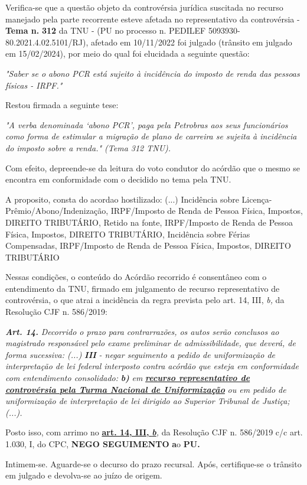 \documentclass[12pt]{article}
\begin{document}
\justifying
\noindent Verifica-se que a questão objeto da controvérsia jurídica suscitada no recurso manejado pela parte recorrente esteve afetada no representativo da controvérsia - \textbf{Tema n. }\textbf{312} da TNU - (PU no processo n. PEDILEF 5093930-80.2021.4.02.5101/RJ),  afetado em 10/11/2022 foi julgado (trânsito em julgado em 15/02/2024), por meio do qual foi elucidada a seguinte questão:

\noindent \textit{"Saber se o abono PCR está sujeito à incidência do imposto de renda das pessoas físicas - IRPF."}

\noindent Restou firmada a seguinte tese:

\noindent \textit{"A verba denominada ‘abono PCR’, paga pela Petrobras aos seus funcionários como forma de estimular a migração de plano de carreira se sujeita à incidência do imposto sobre a renda." (Tema 312 TNU).}

\noindent Com efeito, depreende-se da leitura do voto condutor do acórdão que o mesmo se encontra em conformidade com o decidido no  tema pela TNU.

\noindent A proposito, consta do acordao hostilizado: (...) Incidência sobre Licença-Prêmio/Abono/Indenização, IRPF/Imposto de Renda de Pessoa Física, Impostos, DIREITO TRIBUTÁRIO, Retido na fonte, IRPF/Imposto de Renda de Pessoa Física, Impostos, DIREITO TRIBUTÁRIO, Incidência sobre Férias Compensadas, IRPF/Imposto de Renda de Pessoa Física, Impostos, DIREITO TRIBUTÁRIO

\noindent Nessas condições, o conteúdo do Acórdão recorrido é consentâneo com o entendimento da TNU, firmado em julgamento de recurso representativo de controvérsia, o que atrai a incidência da regra prevista pelo art. 14, III, \textit{b,} da Resolução CJF n. 586/2019:

\noindent \textit{\textbf{Art. 14.}}\textit{ Decorrido o prazo para contrarrazões, os autos serão conclusos ao magistrado responsável pelo exame preliminar de admissibilidade, que deverá, de forma sucessiva: (...) }\textit{\textbf{III }}\textit{- negar seguimento a pedido de uniformização de interpretação de lei federal interposto contra acórdão que esteja em conformidade com entendimento consolidado: }\textit{\textbf{b)}}\textit{ em }\uline{\textit{\textbf{recurso representativo de controvérsia pela Turma Nacional de Uniformização}}}\textit{ ou em pedido de uniformização de interpretação de lei dirigido ao Superior Tribunal de Justiça;(...).}

\noindent Posto isso, com arrimo no \uline{\textbf{art. 14, III, }}\uline{\textit{\textbf{b}}}\textit{,} da Resolução CJF n. 586/2019 c/c art. 1.030, I, do CPC, \textbf{NEGO SEGUIMENTO }\textbf{a}o\textbf{ PU}\textbf{.}

\noindent Intimem-se. Aguarde-se o decurso do prazo recursal. Após, certifique-se o trânsito em julgado e devolva-se ao juízo de origem.
\end{document}
